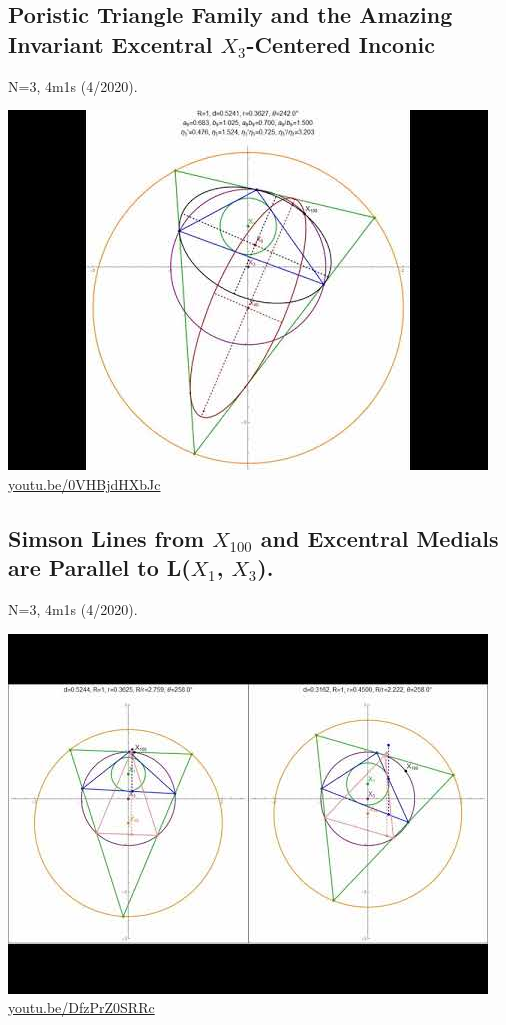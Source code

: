 \documentclass[12pt]{amsart}
\begin{document}
\subsection{Poristic Triangle Family and the Amazing Invariant Excentral $X_{3}$-Centered Inconic}
\label{vid:0VHBjdHXbJc}
\noindent N=3, 4m1s (4/2020). 
\begin{center}\includegraphics[width=.5\textwidth]{pics/0VHBjdHXbJc.jpg} \\ 
\href{https://youtu.be/0VHBjdHXbJc}{\url{youtu.be/0VHBjdHXbJc}}\end{center}
% 

\subsection{Simson Lines from $X_{100}$ and Excentral Medials are Parallel to L($X_{1}$, $X_{3}$).}
\label{vid:DfzPrZ0SRRc}
\noindent N=3, 4m1s (4/2020). 
\begin{center}\includegraphics[width=.5\textwidth]{pics/DfzPrZ0SRRc.jpg} \\ 
\href{https://youtu.be/DfzPrZ0SRRc}{\url{youtu.be/DfzPrZ0SRRc}}\end{center}
% 
\end{document}
